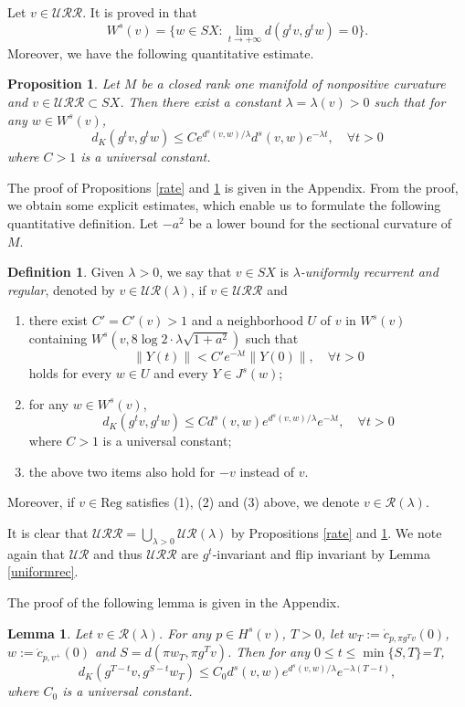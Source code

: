 \documentclass[11pt]{amsart}
\newtheorem{lemma}[theorem]{Lemma}
\newtheorem{proposition}[theorem]{Proposition}
\theoremstyle{definition}
\newtheorem{definition}[theorem]{Definition}
\newcommand{\UR}{\mathcal{UR}}
\newcommand{\URR}{\mathcal{URR}}
\newcommand{\R}{\mathcal{R}}
\begin{document}
Let $v\in \URR$. It is proved in \cite[Proposition 3.10]{BBE} that 
$$W^s(v)=\{w\in SX: \lim_{t\to +\infty}d(g^tv, g^tw)=0\}.$$ 
Moreover, we have the following quantitative estimate.

\begin{proposition}\label{contracting}
Let $M$ be a closed rank one manifold of nonpositive curvature and $v\in \URR\subset SX$. Then there exist a constant $\lambda=\lambda(v)> 0$ such that for any $w\in W^s(v)$,
\begin{equation}\label{e:imp}
d_K(g^tv,g^tw) \le Ce^{d^s(v,w)/\lambda}d^s(v,w)e^{-\lambda t}, \quad \forall t>0
\end{equation}
where $C>1$ is a universal constant.
\end{proposition}
 
The proof of Propositions \ref{rate} and \ref{contracting} is given in the Appendix. From the proof, we obtain some explicit estimates, which enable us to formulate the following quantitative definition. Let $-a^2$ be a lower bound for the sectional curvature of $M$.
\begin{definition}
Given $\lambda>0$, we say that $v\in SX$ is \emph{$\lambda$-uniformly recurrent and regular}, denoted by $v\in \UR(\lambda)$, if $v\in \URR$ and
\begin{enumerate}
   \item there exist $C'=C'(v)>1$ and a neighborhood $U$ of $v$ in $W^s(v)$ containing $W^s(v, 8\log 2\cdot \lambda\sqrt{1+a^2})$ such that 
\begin{equation*}
\|Y(t)\|< C'e^{-\lambda t}\|Y(0)\|, \quad \forall t > 0
\end{equation*}
holds for every $w\in U$ and every $Y\in J^s(w)$;
\item  for any $w\in W^s(v)$,
$$d_K(g^tv,g^tw)\le Cd^s(v,w)e^{d^s(v,w)/\lambda}e^{-\lambda t}, \quad \forall t > 0$$
where $C>1$ is a universal constant;
\item the above two items also hold for $-v$ instead of $v$. 
\end{enumerate}
Moreover, if $v\in \text{Reg}$ satisfies (1), (2) and (3) above, we denote $v\in \R(\lambda)$.
\end{definition}
It is clear that $\URR=\bigcup_{\lambda>0}\UR(\lambda)$ by Propositions \ref{rate} and \ref{contracting}. We note again that $\UR$ and thus $\URR$ are $g^t$-invariant and flip invariant by Lemma \ref{uniformrec}.

The proof of the following lemma is given in the Appendix. 
\begin{lemma}\label{contracting1}
Let $v\in \R(\lambda)$. For any $p\in H^s(v)$, $T>0$, let $w_T:=\dot c_{p, \pi g^Tv}(0)$, $w:=\dot c_{p,v^+}(0)$ and $S= d(\pi w_T, \pi g^Tv)$. Then for any $0\le t\le \min\{S,T\}$=T,
\begin{equation*}
d_K(g^{T-t}v,g^{S-t}w_T) \le C_0d^s(v,w)e^{d^s(v,w)/\lambda}e^{-\lambda (T-t)},
\end{equation*}
where $C_0$ is a universal constant.
\end{lemma}
\end{document}
